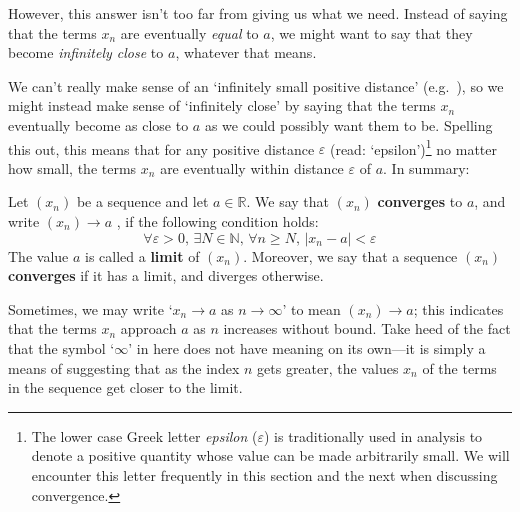 However, this answer isn't too far from giving us what we need. Instead of saying that the terms $x_n$ are eventually \textit{equal} to $a$, we might want to say that they become \textit{infinitely close} to $a$, whatever that means.

We can't really make sense of an `infinitely small positive distance' (e.g.\ ), so we might instead make sense of `infinitely close' by saying that the terms $x_n$ eventually become as close to $a$ as we could possibly want them to be. Spelling this out, this means that for any positive distance $\varepsilon$  (read: `epsilon')\footnote{The lower case Greek letter \textit{epsilon} ($\varepsilon$) is traditionally used in analysis to denote a positive quantity whose value can be made arbitrarily small. We will encounter this letter frequently in this section and the next when discussing convergence.} no matter how small, the terms $x_n$ are eventually within distance $\varepsilon$ of $a$. In summary:

\begin{definition}
\label{defConvergenceOfSequence}
\label{defLimitOfSequence}
Let $(x_n)$ be a sequence and let $a \in \mathbb{R}$. We say that $(x_n)$ \textbf{converges} to $a$, and write $(x_n) \to a$ , if the following condition holds:
\[ \forall \varepsilon > 0,\, \exists N \in \mathbb{N},\, \forall n \ge N,\, |x_n-a| < \varepsilon \]
The value $a$ is called a \textbf{limit} of $(x_n)$. Moreover, we say that a sequence $(x_n)$ \textbf{converges} if it has a limit, and diverges otherwise.
\end{definition}

Sometimes, we may write `$x_n \to a$ as $n \to \infty$' to mean $(x_n) \to a$; this indicates that the terms $x_n$ approach $a$ as $n$ increases without bound. Take heed of the fact that the symbol `$\infty$' in here does not have meaning on its own---it is simply a means of suggesting that as the index $n$ gets greater, the values $x_n$ of the terms in the sequence get closer to the limit.

